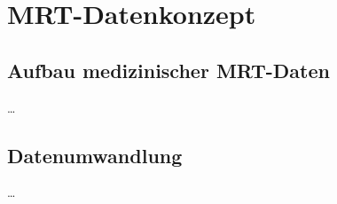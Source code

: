 \section{MRT-Datenkonzept}
\subsection{Aufbau medizinischer MRT-Daten}
\ldots
\subsection{Datenumwandlung}
\ldots

